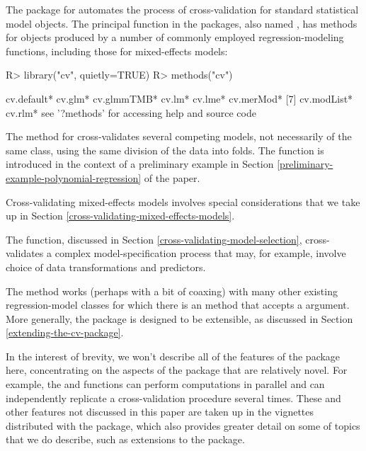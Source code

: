 \documentclass[
]{jss}
\begin{document}
The  package for  automates the process of
cross-validation for standard  statistical model objects.
The principal function in the packages, also named , has
methods for objects produced by a number of commonly employed
regression-modeling functions, including those for mixed-effects models:

\begin{CodeChunk}
\begin{CodeInput}
R> library("cv", quietly=TRUE)
R> methods("cv")
\end{CodeInput}
\begin{CodeOutput}
[1] cv.default* cv.glm*     cv.glmmTMB* cv.lm*      cv.lme*     cv.merMod* 
[7] cv.modList* cv.rlm*    
see '?methods' for accessing help and source code
\end{CodeOutput}
\end{CodeChunk}

The  method for  cross-validates several
competing models, not necessarily of the same class, using the same
division of the data into folds. The  function is introduced
in the context of a preliminary example in Section
\ref{preliminary-example-polynomial-regression} of the paper.

Cross-validating mixed-effects models involves special considerations
that we take up in Section \ref{cross-validating-mixed-effects-models}.

The  function, discussed in Section
\ref{cross-validating-model-selection}, cross-validates a complex
model-specification process that may, for example, involve choice of
data transformations and predictors.

The   method works (perhaps with a bit of
coaxing) with many other existing regression-model classes for which
there is an  method that accepts a  argument.
More generally, the  package is designed to be extensible, as
discussed in Section \ref{extending-the-cv-package}.

In the interest of brevity, we won't describe all of the features of the
 package here, concentrating on the aspects of the package that
are relatively novel. For example, the  and 
functions can perform computations in parallel and can independently
replicate a cross-validation procedure several times. These and other
features not discussed in this paper are taken up in the vignettes
distributed with the package, which also provides greater detail on some
of topics that we do describe, such as extensions to the package.
\end{document}

